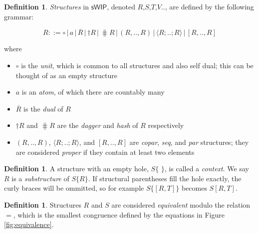 \documentclass[12pt, oneside]{article}
\theoremstyle{plain}
\theoremstyle{definition}
\newtheorem{definition}[theorem]{Definition}
\let\originaldagger\dagger
\renewcommand{\dag}{\mathord{\originaldagger}}
\newcommand{\la}{\langle}
\newcommand{\ra}{\rangle}
\newcommand{\sSys}{{\mathsf{sWIP}}}%
\newcommand{\unit}{\circ}
\begin{document}
\begin{definition}
\textit{Structures} in $\sSys$, denoted $R$,$S$,$T$,$V$.., are defined by the following grammar:

\[R ::= \unit \,|\, a \,|\, \overline{R} \,|\, \dag R \,|\, \hash R \,|\, (R,..,R) \,|\, \la R;..;R\ra \,|\, [R,..,R]\]

where
\begin{itemize}
\item $\unit$ is the \textit{unit}, which is common to all structures and also self dual; this can be thought of as an empty structure
\item $a$ is an \textit{atom}, of which there are countably many
\item $\overline{R}$ is the \textit{dual} of $R$
\item $\dag R$ and $\hash R$ are the \textit{dagger} and \textit{hash} of $R$ respectively
\item $(R,..,R)$, $\la R;..;R\ra$, and $[R,..,R]$ are \textit{copar}, \textit{seq}, and \textit{par} structures; they are considered \textit{proper} if they contain at least two elements
\end{itemize}
\end{definition}

\begin{definition}
A structure with an empty hole, $S\{\,\,\}$, is called a \textit{context}.
We say $R$ is a \textit{substructure} of $S\{R\}$.
If structural parentheses fill the hole exactly, the curly braces will be ommitted, so for example $S\{[R,T]\}$ becomes $S[R,T]$.
\end{definition}

\begin{definition}
Structures $R$ and $S$ are considered \textit{equivalent} modulo the relation $=$, which is the smallest congruence defined by the equations in Figure \ref{fig:equivalence}.
\end{definition}
\end{document}
